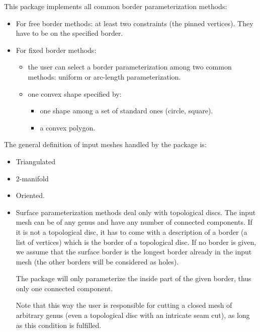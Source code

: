This package implements all common border parameterization methods:
\begin{itemize}

\item For free border methods: at least two constraints (the pinned
vertices). They have to be on the specified border.

\item For fixed border methods:

    \begin{itemize}

    \item the user can select a border
        parameterization among two common methods: uniform or
        arc-length parameterization.

    \item one convex shape specified by:

        \begin{itemize}

        \item one shape among a set of standard ones (circle, square).

        \item a convex polygon.

        \end{itemize}

    \end{itemize}

\end{itemize}



The general definition of input meshes handled by the package is:

\begin{itemize}

\item Triangulated

\item 2-manifold

\item Oriented.

\item Surface parameterization methods deal only with topological discs.
The input mesh can be of any genus and have any number of connected components.
If it is not a topological disc, it has to come with a description of a border
(a list of vertices) which is the border of a topological disc.
If no border is given, we assume that the surface border
is the longest border already in the input mesh (the other borders will
be considered as holes).

The package will only parameterize the inside part of the given border,
thus only one connected component.

Note that this way the user is responsible for cutting a closed mesh of
arbitrary genus (even a topological disc with an intricate seam
cut), as long as this condition is fulfilled.

\end{itemize}


